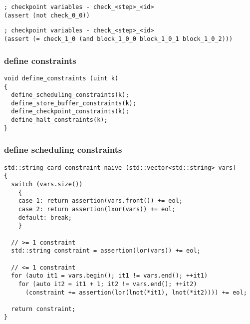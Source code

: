 \begin{lstlisting}[language=SMTLib]
; checkpoint variables - check_<step>_<id>
(assert (not check_0_0))
\end{lstlisting}

\begin{lstlisting}[language=SMTLib]
; checkpoint variables - check_<step>_<id>
(assert (= check_1_0 (and block_1_0_0 block_1_0_1 block_1_0_2)))
\end{lstlisting}

\subsubsection{define constraints}

\begin{lstlisting}[style=c++]
void define_constraints (uint k)
{
  define_scheduling_constraints(k);
  define_store_buffer_constraints(k);
  define_checkpoint_constraints(k);
  define_halt_constraints(k);
}
\end{lstlisting}

\subsubsection{define scheduling constraints}

\begin{lstlisting}[style=c++]
std::string card_constraint_naive (std::vector<std::string> vars)
{
  switch (vars.size())
    {
    case 1: return assertion(vars.front()) += eol;
    case 2: return assertion(lxor(vars)) += eol;
    default: break;
    }

  // >= 1 constraint
  std::string constraint = assertion(lor(vars)) += eol;

  // <= 1 constraint
  for (auto it1 = vars.begin(); it1 != vars.end(); ++it1)
    for (auto it2 = it1 + 1; it2 != vars.end(); ++it2)
      (constraint += assertion(lor(lnot(*it1), lnot(*it2)))) += eol;

  return constraint;
}
\end{lstlisting}

